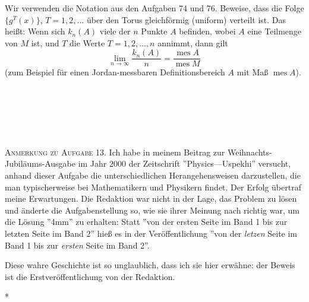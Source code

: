 \documentclass[12pt]{article} %
\begin{document}
\bigskip
{} Wir verwenden die Notation aus den Aufgaben 74 und 76. Beweise, dass die Folge $\{g^T (x)\}$, $T=1, 2, \dots$ über den Torus gleichförmig (uniform) verteilt ist. Das heißt: Wenn sich $k_n(A)$ viele der $n$ Punkte $A$ befinden, wobei $A$ eine Teilmenge von $M$ ist, und $T$ die Werte $T=1, 2, \dots,n$ annimmt, dann gilt
\[
\lim_{n \to \infty} \frac{k_n(A)}{n}=\frac{\operatorname{mes} A}{\operatorname{mes} M}
\]
(zum Beispiel für einen Jordan-messbaren Definitionsbereich $A$ mit Maß $\operatorname{mes} A$).

\ 

\ 

\ 

\textsc{Anmerkung zu Aufgabe 13.} Ich habe in meinem Beitrag zur Weihnachts-Jubiläums-Ausgabe im Jahr 2000 der Zeitschrift ''Physics—Uspekhi'' versucht, anhand dieser Aufgabe die unterschiedlichen Herangehensweisen darzustellen, die man typischerweise bei Mathematikern und Physikern findet. Der Erfolg übertraf meine Erwartungen. Die Redaktion war nicht in der Lage, das Problem zu lösen und änderte die Aufgabenstellung so, wie sie ihrer Meinung nach richtig war, um die Lösung ''4mm'' zu erhalten: Statt ''von der ersten Seite im Band 1 bis zur letzten Seite im Band 2'' hieß es in der Veröffentlichung ''von der {\em letzen\/} Seite im Band 1 bis zur {\em ersten\/} Seite im Band 2''. 

Diese wahre Geschichte ist so unglaublich, dass ich sie hier erwähne: der Beweis ist die Erstveröffentlichung von der Redaktion. 
\ 

\vspace{0pt plus 12pt}
\centerline{*\quad *\quad*}
\vspace{.4\baselineskip}

\

\ 

\ 

{\em
{}
}
\end{document}
